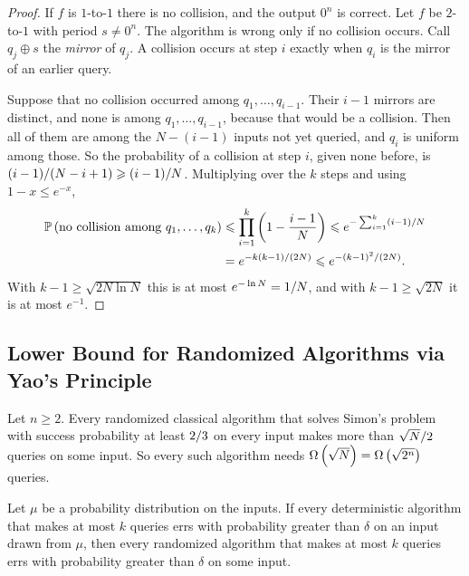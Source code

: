 \begin{proof}
    If $f$ is $1$-to-$1$ there is no collision, and the output $0^n$ is correct. Let $f$ be $2$-to-$1$
    with period $s \neq 0^n$. The algorithm is wrong only if no collision occurs. Call $q_j \oplus s$
    the \emph{mirror} of $q_j$. A collision occurs at step $i$ exactly when $q_i$ is the mirror of an
    earlier query.

    Suppose that no collision occurred among $q_1, \dots, q_{i-1}$. Their $i - 1$ mirrors are distinct,
    and none is among $q_1, \dots, q_{i-1}$, because that would be a collision. Then all of them are
    among the $N - (i-1)$ inputs not yet queried, and $q_i$ is uniform among those. So the
    probability of a collision at step $i$, given none before, is
    $(i-1)/(N-i+1) \geqslant (i-1)/N$. Multiplying over the $k$ steps and using
    $1 - x \leq e^{-x}$,
    \begin{align*}
        \prob{\text{no collision among } q_1, \dots, q_k}
         & \leq \prod_{i=1}^{k} \left(1 - \frac{i-1}{N}\right)
        \leq e^{-\sum_{i=1}^{k} (i-1)/N} \\
         & = e^{-k(k-1)/(2N)} \leq e^{-(k-1)^2/(2N)}.
    \end{align*}
    With $k - 1 \geq \sqrt{2N \ln N}$ this is at most $e^{-\ln N} = 1/N$, and with
    $k - 1 \geq \sqrt{2N}$ it is at most $e^{-1}$.
\end{proof}

\subsection{Lower Bound for Randomized Algorithms via Yao's Principle}

\begin{theorem}\label{thm:simon-rand-lb-1001}
    Let $n \geq 2$. Every randomized classical algorithm that solves Simon's problem with success
    probability at least $2/3$ on every input makes more than $\sqrt{N}/2$ queries on
    some input. So every such algorithm needs $\Omega\left(\sqrt{N}\right) = \Omega\left(\sqrt{2^n}\right)$ queries.
\end{theorem}

\begin{lemma}\label{lem:yao-1001}
    Let $\mu$ be a probability distribution on the inputs. If every deterministic algorithm that makes at
    most $k$ queries errs with probability greater than $\delta$ on an input drawn from $\mu$, then every
    randomized algorithm that makes at most $k$ queries errs with probability greater than $\delta$ on
    some input.
\end{lemma}

